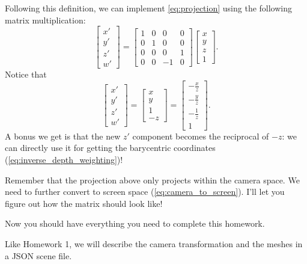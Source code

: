 Following this definition, we can implement \cref{eq:projection} using the following matrix multiplication:
\begin{equation}
\begin{bmatrix}
x' \\
y' \\
z' \\
w'
\end{bmatrix} =
\begin{bmatrix}
1 & 0 & 0 & 0 \\
0 & 1 & 0 & 0 \\
0 & 0 & 0 & 1 \\
0 & 0 & -1 & 0
\end{bmatrix}
\begin{bmatrix}
x \\
y \\
z \\
1
\end{bmatrix}.
\end{equation}
Notice that
\begin{equation}
\begin{bmatrix}
x' \\
y' \\
z' \\
w'
\end{bmatrix}
=
\begin{bmatrix}
x \\
y \\
1 \\
-z
\end{bmatrix}
=
\begin{bmatrix}
-\frac{x}{z} \\
-\frac{y}{z} \\
-\frac{1}{z} \\
1
\end{bmatrix}.
\end{equation}
A bonus we get is that the new $z'$ component becomes the reciprocal of $-z$: we can directly use it for getting the barycentric coordinates (\cref{eq:inverse_depth_weighting})!

Remember that the projection above only projects within the camera space. We need to further convert to screen space (\cref{eq:camera_to_screen}). I'll let you figure out how the matrix should look like! 

Now you should have everything you need to complete this homework. 

Like Homework 1, we will describe the camera transformation and the meshes in a JSON scene file. 

